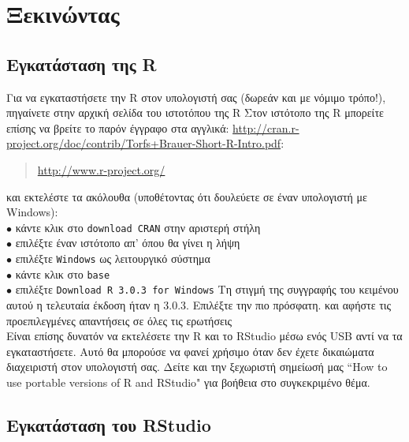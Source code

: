 \documentclass[a4paper,10pt,twocolumn]{article}
\makeatletter
\let\SF@@footnote\footnote
\def\footnote{\ifx\protect\@typeset@protect
 \expandafter\SF@@footnote
 \else
 \expandafter\SF@gobble@opt
 \fi
}
\edef\SF@gobble@opt{\noexpand\protect
 \expandafter\noexpand\csname SF@gobble@opt \endcsname}
\makeatother
\begin{document}
\section{Ξεκινώντας}

\subsection{Εγκατάσταση της R}

Για να εγκαταστήσετε την R στον υπολογιστή σας (δωρεάν και με νόμιμο τρόπο!), πηγαίνετε στην
αρχική σελίδα του ιστοτόπου της R\footnote{Στον ιστότοπο της R μπορείτε επίσης να βρείτε το παρόν έγγραφο
στα αγγλικά: \url{http://cran.r-project.org/doc/contrib/Torfs+Brauer-Short-R-Intro.pdf}}:
\begin{quote}
  \url{http://www.r-project.org/}
\end{quote}
και εκτελέστε τα ακόλουθα (υποθέτοντας ότι δουλεύετε σε έναν υπολογιστή με Windows):\\
\noindent $\bullet$ κάντε κλικ στο \texttt{download CRAN} στην αριστερή στήλη\\
\noindent $\bullet$ επιλέξτε έναν ιστότοπο  απ' όπου θα γίνει η λήψη\\
\noindent $\bullet$ επιλέξτε \texttt{Windows} ως λειτουργικό σύστημα\\
\noindent $\bullet$ κάντε κλικ στο \texttt{base}\\
\noindent $\bullet$ επιλέξτε \texttt{Download R 3.0.3 for Windows} \footnote{Τη στιγμή της
συγγραφής του κειμένου αυτού η τελευταία έκδοση ήταν η 3.0.3. Επιλέξτε την πιο πρόσφατη.} και
αφήστε τις προεπιλεγμένες απαντήσεις σε όλες τις ερωτήσεις\\

Είναι επίσης δυνατόν να εκτελέσετε την R και το RStudio μέσω ενός USB αντί να τα εγκαταστήσετε. Αυτό
θα μπορούσε να φανεί χρήσιμο όταν δεν έχετε δικαιώματα διαχειριστή στον υπολογιστή σας. Δείτε και 
την ξεχωριστή σημείωσή μας ``How to use portable versions of R and RStudio" για βοήθεια στο 
συγκεκριμένο θέμα.

\subsection{Εγκατάσταση του RStudio}
\end{document}

